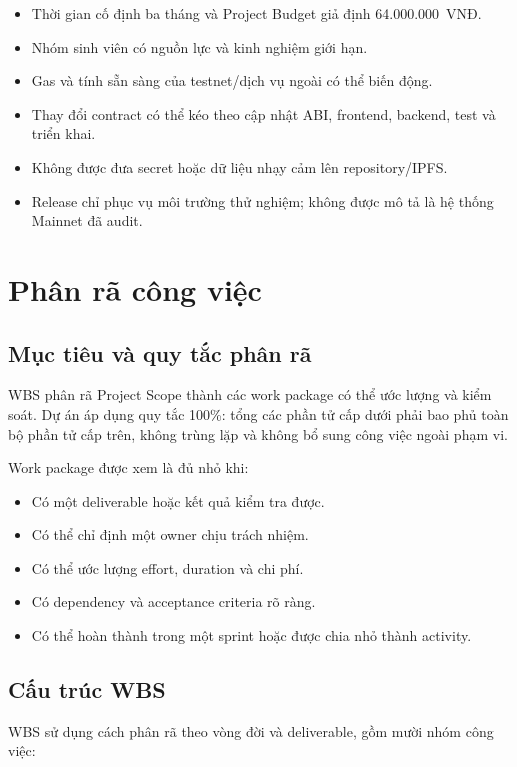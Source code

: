 \begin{itemize}
  \item Thời gian cố định ba tháng và Project Budget giả định 64.000.000~VNĐ.
  \item Nhóm sinh viên có nguồn lực và kinh nghiệm giới hạn.
  \item Gas và tính sẵn sàng của testnet/dịch vụ ngoài có thể biến động.
  \item Thay đổi contract có thể kéo theo cập nhật ABI, frontend, backend, test và triển khai.
  \item Không được đưa secret hoặc dữ liệu nhạy cảm lên repository/IPFS.
  \item Release chỉ phục vụ môi trường thử nghiệm; không được mô tả là hệ thống Mainnet đã audit.
\end{itemize}

\fi
\section{Phân rã công việc}

\subsection{Mục tiêu và quy tắc phân rã}

WBS phân rã Project Scope thành các work package có thể ước lượng và kiểm soát. Dự án áp dụng quy tắc 100\%: tổng các phần tử cấp dưới phải bao phủ toàn bộ phần tử cấp trên, không trùng lặp và không bổ sung công việc ngoài phạm vi.

Work package được xem là đủ nhỏ khi:

\begin{itemize}
  \item Có một deliverable hoặc kết quả kiểm tra được.
  \item Có thể chỉ định một owner chịu trách nhiệm.
  \item Có thể ước lượng effort, duration và chi phí.
  \item Có dependency và acceptance criteria rõ ràng.
  \item Có thể hoàn thành trong một sprint hoặc được chia nhỏ thành activity.
\end{itemize}

\subsection{Cấu trúc WBS}

WBS sử dụng cách phân rã theo vòng đời và deliverable, gồm mười nhóm công việc:

